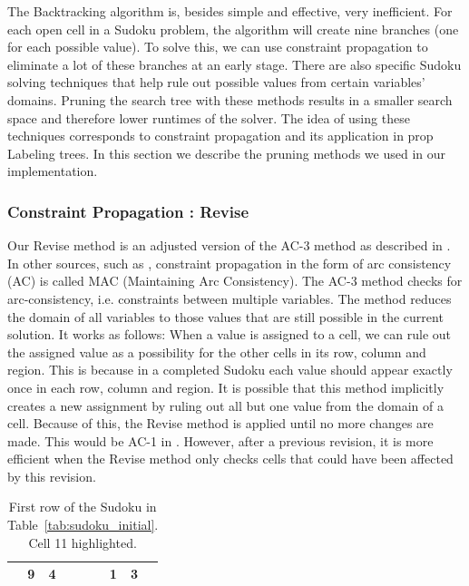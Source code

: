 \documentclass[11pt]{article} %
\begin{document}
The Backtracking algorithm is, besides simple and effective, very inefficient. For each open cell in a Sudoku problem, the algorithm will create nine branches (one for each possible value). To solve this, we can use constraint propagation to eliminate a lot of these branches at an early stage. There are also specific Sudoku solving techniques that help rule out possible values from certain variables' domains. Pruning the search tree with these methods results in a smaller search space and therefore lower runtimes of the solver. The idea of using these techniques corresponds to constraint propagation and its application in prop Labeling trees. In this section we describe the pruning methods we used in our implementation.

\subsubsection{Constraint Propagation : Revise}

Our Revise method is an adjusted version of the AC-3 method as described in \citet{BartakConsistency}.
In other sources, such as \citet{Apt2003}, constraint propagation in the form of arc consistency (AC) is called MAC (Maintaining Arc Consistency).
The AC-3 method checks for arc-consistency, i.e. constraints between multiple variables. The method reduces the domain of all variables to those values that are still possible in the current solution.
It works as follows: When a value is assigned to a cell, we can rule out the assigned value as a possibility for the other cells in its row, column and region. This is because in a completed Sudoku each value should appear exactly once in each row, column and region. It is possible that this method implicitly creates a new assignment by ruling out all but one value from the domain of a cell. Because of this, the Revise method is applied until no more changes are made. This would be AC-1 in \cite{BartakConsistency}. However, after a previous revision, it is more efficient when the Revise method only checks cells that could have been affected by this revision.

\begin{table}[htbp]
\caption{First row of the Sudoku in Table~\ref{tab:sudoku_initial}. Cell 11 highlighted.}
    \label{tab:sudoku_frstrow}

    \begin{center}
        \begin{tabular}{||c|c|c||c|c|c||c|c|c||}
        \hline
        \hline
        \cellcolor[gray]{0.5} & 9 & 4 &  &  &  & 1 & 3 & \\
        \hline
        \end{tabular}
    \end{center}
\end{table}
\end{document}
